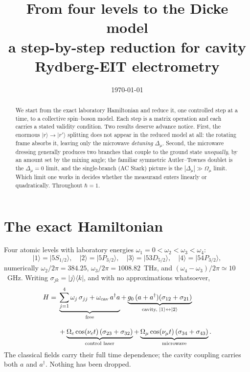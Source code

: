 \documentclass[11pt,a4paper]{article}
\title{\bfseries From four levels to the Dicke model\\[3pt]
\large a step-by-step reduction for cavity Rydberg-EIT electrometry}
\author{}
\date{\today}
\newcommand{\ket}[1]{\lvert #1 \rangle}
\newcommand{\bra}[1]{\langle #1 \rvert}
\newcommand{\dg}{^{\dagger}}
\newcommand{\Om}{\Omega}
\newcommand{\Omu}{\Omega_{\mu}}
\newcommand{\Dmu}{\Delta_{\mu}}
\begin{document}
\maketitle
\vspace{-10mm}

\begin{abstract}\noindent
We start from the exact laboratory Hamiltonian and reduce it, one controlled step at a time,
to a collective spin--boson model. Each step is a matrix operation and each carries a stated
validity condition. Two results deserve advance notice. First, the enormous
$\ket{r}\!\to\!\ket{r'}$ splitting does not appear in the reduced model at all: the rotating
frame absorbs it, leaving only the microwave \emph{detuning} $\Dmu$. Second, the microwave
dressing generally produces two branches that couple to the ground state \emph{unequally}, by
an amount set by the mixing angle; the familiar symmetric Autler--Townes doublet is the
$\Dmu=0$ limit, and the single-branch (AC Stark) picture is the $|\Dmu|\gg\Omu$ limit. Which
limit one works in decides whether the measurand enters linearly or quadratically. Throughout
$\hbar=1$.
\end{abstract}

\section{The exact Hamiltonian}

Four atomic levels with laboratory energies $\omega_1=0<\omega_2<\omega_3<\omega_4$:
\[
  \ket{1}=\ket{5S_{1/2}},\quad \ket{2}=\ket{5P_{3/2}},\quad
  \ket{3}=\ket{53D_{5/2}},\quad \ket{4}=\ket{54P_{3/2}},
\]
numerically $\omega_2/2\pi=384.25$, $\omega_3/2\pi=1008.82$~THz, and
$(\omega_4-\omega_3)/2\pi\simeq10$~GHz. Writing $\sigma_{jk}=\ket{j}\bra{k}$, and with no
approximations whatsoever,
\begin{equation}
\begin{split}
  H = {}& \underbrace{\sum_{j=1}^{4}\omega_j\,\sigma_{jj} + \omega_{\rm cav}\,a\dg a}_{\text{free}}
   + \underbrace{g_0\,(a+a\dg)(\sigma_{12}+\sigma_{21})}_{\text{cavity, }\ket{1}\leftrightarrow\ket{2}} \\[2ex]
   & + \underbrace{\Om_c\cos(\nu_c t)\,(\sigma_{23}+\sigma_{32})}_{\text{control laser}}
   + \underbrace{\Omu\cos(\nu_\mu t)\,(\sigma_{34}+\sigma_{43})}_{\text{microwave}} .
\end{split}
  \label{eq:lab}
\end{equation}
The classical fields carry their full time dependence; the cavity coupling carries both
$a$ and $a\dg$. Nothing has been dropped.
\end{document}
